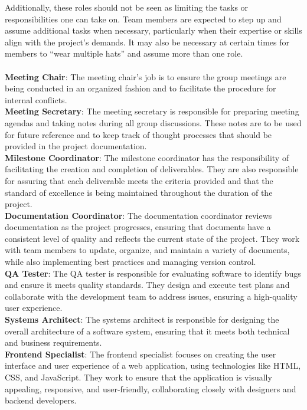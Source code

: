 \documentclass{article}
\begin{document}
Additionally, these roles should not be seen as limiting the tasks or responsibilities one can take on. Team members are expected to step up and assume additional tasks when necessary, particularly when their expertise or skills align with the project’s demands. It may also be necessary at certain times for members to “wear multiple hats” and assume more than one role.
\\
\\
\textbf{Meeting Chair}: The meeting chair’s job is to ensure the group meetings are being conducted in an organized fashion and to facilitate the procedure for internal conflicts.
\\
\textbf{Meeting Secretary}: The meeting secretary is responsible for preparing meeting agendas and taking notes during all group discussions. These notes are to be used for future reference and to keep track of thought processes that should be provided in the project documentation.
\\
\textbf{Milestone Coordinator}: The milestone coordinator has the responsibility of facilitating the creation and completion of deliverables. They are also responsible for assuring that each deliverable meets the criteria provided and that the standard of excellence is being maintained throughout the duration of the project.
\\
\textbf{Documentation Coordinator}: The documentation coordinator reviews documentation as the project progresses, ensuring that documents have a consistent level of quality and reflects the current state of the project. They work with team members to update, organize, and maintain a variety of documents, while also implementing best practices and managing version control.
\\
\textbf{QA Tester}: The QA tester is responsible for evaluating software to identify bugs and ensure it meets quality standards. They design and execute test plans and collaborate with the development team to address issues, ensuring a high-quality user experience.
\\
\textbf{Systems Architect}: The systems architect is responsible for designing the overall architecture of a software system, ensuring that it meets both technical and business requirements.
\\
\textbf{Frontend Specialist}: The frontend specialist focuses on creating the user interface and user experience of a web application, using technologies like HTML, CSS, and JavaScript. They work to ensure that the application is visually appealing, responsive, and user-friendly, collaborating closely with designers and backend developers.
\end{document}
